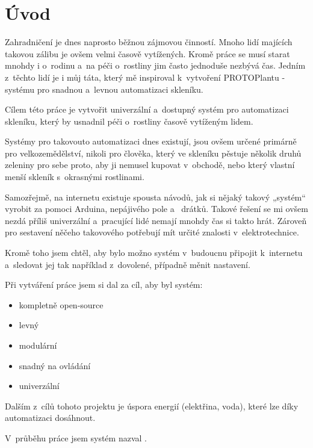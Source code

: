 \chapter*{Úvod}

Zahradničení je dnes naprosto běžnou zájmovou činností. Mnoho lidí majících takovou zálibu je ovšem velmi časově vytížených. Kromě práce se musí starat mnohdy i o~rodinu a~na péči o~rostliny jim často jednoduše nezbývá čas. Jedním z~těchto lidí je i můj táta, který mě inspiroval k~vytvoření PROTOPlantu - systému pro snadnou a~levnou automatizaci skleníku.

Cílem této práce je vytvořit univerzální a~dostupný systém pro automatizaci skleníku, který by usnadnil péči o~rostliny časově vytíženým lidem. 

Systémy pro takovouto automatizaci dnes existují, jsou ovšem určené primárně pro velkozemědělství, nikoli pro člověka, který ve skleníku pěstuje několik druhů zeleniny pro sebe proto, aby ji nemusel kupovat v~obchodě, nebo který vlastní menší skleník s~okrasnými rostlinami. 

Samozřejmě, na internetu existuje spousta návodů, jak si nějaký takový „systém“ vyrobit za pomoci Arduina, nepájivého pole a~ drátků.
Takové řešení se mi ovšem nezdá příliš univerzální a~pracující lidé nemají mnohdy čas si takto hrát.
Zároveň pro sestavení něčeho takovového potřebují mít určité znalosti v~elektrotechnice.

Kromě toho jsem chtěl, aby bylo možno systém v~budoucnu připojit k~internetu a~sledovat jej tak například z~dovolené, případně měnit nastavení.

Při vytváření práce jsem si dal za cíl, aby byl systém:
\begin{itemize}
    \item kompletně open-source
    \item levný
    \item modulární
    \item snadný na ovládání
    \item univerzální
\end{itemize}

Dalším z~cílů tohoto projektu je úspora energií (elektřina, voda), které lze díky automatizaci dosáhnout.

V~průběhu práce jsem systém nazval .

\fxnote[author=PŠ]{\textcolor{mygreen}{Zde je ještě potřeba provést úpravy.}}

\newpage
